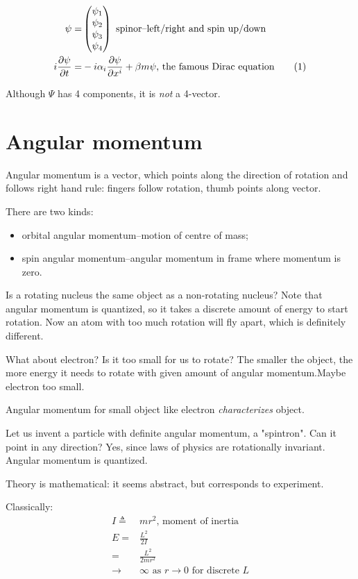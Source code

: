 \documentclass[]{article}
\newcommand\numberthis{\addtocounter{equation}{1}\tag{\theequation}}
\begin{document}
\begin{align*}
	\psi =& \begin{pmatrix}
		\psi_1\\
		\psi_2\\
		\psi_3\\
		\psi_4
	\end{pmatrix} \text{ spinor--left/right and spin up/down}\\
	i \frac{\partial \psi}{\partial t} =& -i \alpha_i \frac{\partial \psi}{\partial x^i} + \beta m \psi \text{, the famous Dirac equation} \numberthis \label{eq:famous:dirac}
\end{align*}

Although $\Psi$ has 4 components, it is \emph{not} a 4-vector.

\section{Angular momentum}

Angular momentum is a vector, which points along the direction of rotation and follows right hand rule: fingers follow rotation, thumb points along vector.

There are two kinds:
\begin{itemize}
	\item orbital angular momentum--motion of centre of mass;
	\item spin angular momentum--angular momentum in frame where momentum is zero.
\end{itemize}

Is a rotating nucleus the same object as a non-rotating nucleus? Note that angular momentum is quantized, so it takes a discrete amount of energy to start rotation. Now an atom with too much rotation will fly apart, which is definitely different. 

What about electron? Is it too small for us to rotate? The smaller the object, the more energy it needs to rotate with given amount of angular momentum.Maybe electron too small.

Angular momentum for small object like electron \emph{characterizes} object.

Let us invent a particle with definite angular momentum, a "spintron". Can it point in any direction? Yes, since laws of physics are rotationally invariant. Angular momentum is quantized.

Theory is mathematical: it seems abstract, but corresponds to experiment.

Classically:
\begin{align*}
I\triangleq&mr^2 \text{, moment of inertia}\\
E=&\frac{L^2}{2I}\\
=&\frac{L^2}{2mr^2}\\
\rightarrow &\infty \text{ as } r \rightarrow 0 \text{ for discrete $L$}
\end{align*}
\end{document}
